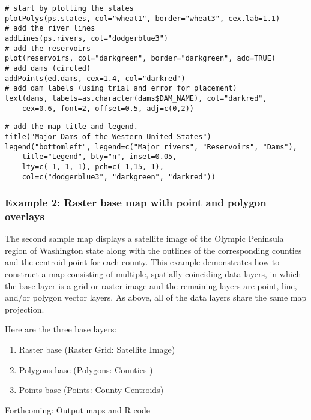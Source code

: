 \documentclass{beamer}
\begin{document}
\begin{frame}[fragile]
\begin{framed}
\begin{verbatim} 
# start by plotting the states
plotPolys(ps.states, col="wheat1", border="wheat3", cex.lab=1.1)
# add the river lines
addLines(ps.rivers, col="dodgerblue3")
# add the reservoirs
plot(reservoirs, col="darkgreen", border="darkgreen", add=TRUE)
# add dams (circled)
addPoints(ed.dams, cex=1.4, col="darkred")
# add dam labels (using trial and error for placement)
text(dams, labels=as.character(dams$DAM_NAME), col="darkred",
    cex=0.6, font=2, offset=0.5, adj=c(0,2))
\end{verbatim}
\end{framed}
\end{frame}


\begin{frame}[fragile]
\begin{framed}
\begin{verbatim} 
# add the map title and legend.
title("Major Dams of the Western United States")
legend("bottomleft", legend=c("Major rivers", "Reservoirs", "Dams"),
    title="Legend", bty="n", inset=0.05,
    lty=c( 1,-1,-1), pch=c(-1,15, 1),
    col=c("dodgerblue3", "darkgreen", "darkred"))

\end{verbatim}
\end{framed}
\end{frame}


\begin{frame}[fragile]
\frametitle{Example 2: Raster base map with point and polygon overlays}
The second sample map displays a satellite image of the Olympic Peninsula region of Washington state along with the outlines of the corresponding counties and the centroid point for each county. This example demonstrates how to construct a map consisting of multiple, spatially coinciding data layers, in which the base layer is a grid or raster image and the remaining layers are point, line, and/or polygon vector layers. As above, all of the data layers share the same map projection.
\end{frame}

\begin{frame}[fragile]
Here are the three base layers:
\begin{enumerate}
\item Raster base (Raster Grid: Satellite Image)            
\item Polygons base (Polygons: Counties )       
\item Points base (Points: County Centroids)
\end{enumerate}
Forthcoming: Output maps and R code
\end{frame}
\end{document}

